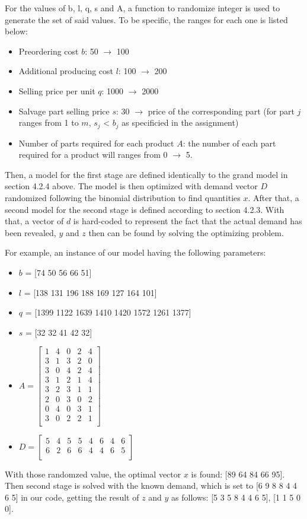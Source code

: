 		\qquad For the values of b, l, q, s and A, a function to randomize integer is used to generate the set of said values. To be specific, the ranges for each one is listed below:

		\begin{itemize}
			\item Preordering cost $b$: 50 $\rightarrow$ 100
			\item Additional producing cost $l$: 100 $\rightarrow$ 200
			\item Selling price per unit $q$: 1000 $\rightarrow$ 2000
			\item Salvage part selling price $s$: 30 $\rightarrow$ price of the corresponding part (for part $j$ ranges from 1 to $m$, $s_j$ < $b_j$ as specificied in the assignment)
			\item Number of parts required for each product $A$: the number of each part required for a product will ranges from 0 $\rightarrow$ 5.
		\end{itemize}

		\qquad Then, a model for the first stage are defined identically to the grand model in section 4.2.4 above. The model is then optimized with demand vector $D$ randomized following the binomial distribution to find quantities $x$. After that, a second model for the second stage is defined according to section 4.2.3. With that, a vector of $d$ is hard-coded to represent the fact that the actual demand has been revealed, $y$ and $z$ then can be found by solving the optimizing problem.

		\qquad For example, an instance of our model having the following parameters:

		\begin{itemize}
			\item $b$ = [74 50 56 66 51]
			\item $l$ = [138 131 196 188 169 127 164 101]
			\item $q$ = [1399 1122 1639 1410 1420 1572 1261 1377]
			\item $s$ = [32 32 41 42 32]
			\item $A = 	\begin{bmatrix}
							1 & 4 & 0 & 2 & 4 \\
							3 & 1 & 3 & 2 & 0 \\
							3 & 0 & 4 & 2 & 4 \\
							3 & 1 & 2 & 1 & 4 \\
							3 & 2 & 3 & 1 & 1 \\
							2 & 0 & 3 & 0 & 2 \\
							0 & 4 & 0 & 3 & 1 \\
							3 & 0 & 2 & 2 & 1 \\
						\end{bmatrix}$
			\item $D = 	\begin{bmatrix}
							5 & 4 & 5 & 5 & 4 & 6 & 4 & 6 \\
							6 & 2 & 6 & 6 & 4 & 4 & 6 & 5 \\
						\end{bmatrix}$
		\end{itemize}

		\qquad With those randomzed value, the optimal vector $x$ is found: [89 64 84 66 95]. Then second stage is solved with the known demand, which is set to [6 9 8 8 4 4 6 5] in our code, getting the result of $z$ and $y$ as follows: [5 3 5 8 4 4 6 5], [1 1 5 0 0].
